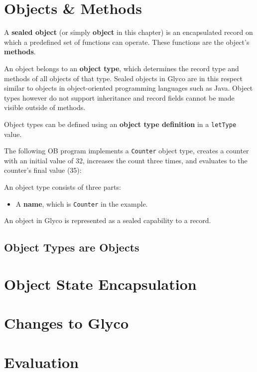 \documentclass[main.tex]{subfiles}
\begin{document}
\section{Objects \& Methods} \label{sct:obj-meth}
A \textbf{sealed object} (or simply \textbf{object} in this chapter) is an encapsulated record on which a predefined set of functions can operate. These functions are the object's \textbf{methods}.

An object belongs to an \textbf{object type}, which determines the record type and methods of all objects of that type. Sealed objects in Glyco are in this respect similar to objects in object-oriented programming languages such as Java. Object types however do not support inheritance and record fields cannot be made visible outside of methods.

Object types can be defined using an \textbf{object type definition} in a \texttt{letType} value.

The following OB program implements a \texttt{Counter} object type, creates a counter with an initial value of 32, increases the count three times, and evaluates to the counter's final value (35):

An object type consists of three parts:
\begin{itemize}
    \item A \textbf{name}, which is \texttt{Counter} in the example.
\end{itemize}

An object in Glyco is represented as a sealed capability to a record.

\subsection{Object Types are Objects}

\section{Object State Encapsulation} \label{sct:obj-sec}

\section{Changes to Glyco} \label{sct:obj-changes}

\section{Evaluation} \label{sct:obj-eval}

\onlyinsubfile{\glsaddall\printglossaries}
\end{document}
